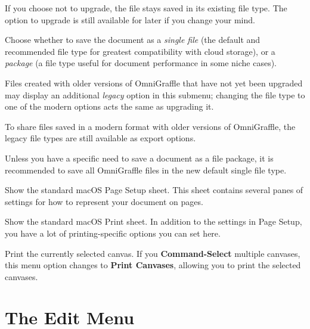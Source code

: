 \documentclass[../main.tex]{subfiles}
\begin{document}
\begin{description}[style=nextline]
    If you choose not to upgrade, the file stays saved in its existing file type. The option to
    upgrade is still available for later if you change your mind.
  \item[{Change File Type}] Choose whether to save the document as a \textit{single file} (the
    default and recommended file type for greatest compatibility with cloud storage), or a
    \textit{package} (a file type useful for document performance in some niche cases).

    Files created with older versions of OmniGraffle that have not yet been upgraded may display
    an additional \textit{legacy} option in this submenu; changing the file type to one of the
    modern options acts the same as upgrading it.

    To share files saved in a modern format with older versions of OmniGraffle, the legacy file
    types are still available as export options.
\end{description}

\begin{ognote}
  Unless you have a specific need to save a document as a file package, it is recommended to save
  all OmniGraffle files in the new default single file type.
\end{ognote}

\begin{description}[style=nextline]
  \item[{Page Setup (\textbf{Shift-Command-P})}] Show the standard macOS Page Setup sheet. This
    sheet contains several panes of settings for how to represent your document on pages.
  \item[{Print (\textbf{Command-P})}] Show the standard macOS Print sheet. In addition to the
    settings in Page Setup, you have a lot of printing-specific options you can set here.
  \item[{Print this Canvas}] Print the currently selected canvas. If you \textbf{Command-Select}
    multiple canvases, this menu option changes to \textbf{Print Canvases}, allowing you to
    print the selected canvases.
\end{description}

\section{The Edit Menu}
\end{document}
